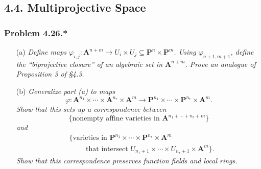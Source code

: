 \documentclass{article}
\begin{document}



\subsection*{4.4. Multiprojective Space \\}



\subsubsection*{Problem 4.26.*}
\emph{}
\begin{enumerate}
\item[(a)]
  \emph{Define maps
  $\varphi_{i,j}: \mathbf{A}^{n+m}
  \to
  U_i \times U_j
  \subseteq
  \mathbf{P}^{n} \times \mathbf{P}^{m}$.
  Using $\varphi_{n+1,m+1}$, define the
  ``biprojective closure'' of an algebraic set in $\mathbf{A}^{n+m}$.
  Prove an analogue of Proposition 3 of \S 4.3.}

\item[(b)]
  \emph{Generalize part (a) to maps
  \[
    \varphi:
    \mathbf{A}^{n_1} \times \cdots \times \mathbf{A}^{n_r} \times \mathbf{A}^{m}
    \to
    \mathbf{P}^{n_1} \times \cdots \times \mathbf{P}^{n_r} \times \mathbf{A}^{m}.
  \]
  Show that this sets up a correspondence between
  \[
    \{ \text{nonempty affine varieties in $\mathbf{A}^{n_1 + \cdots + n_r + m}$} \}
  \]
  and
  \begin{align*}
    & \{ \text{varieties in }
      \mathbf{P}^{n_1} \times \cdots \times \mathbf{P}^{n_r} \times \mathbf{A}^{m} \\
    & \qquad
      \text{ that intersect }
      U_{n_1+1} \times \cdots \times U_{n_r+1} \times \mathbf{A}^{m} \}.
  \end{align*}
  Show that this correspondence preserves function fields and local rings.} \\
\end{enumerate}
\end{document}
